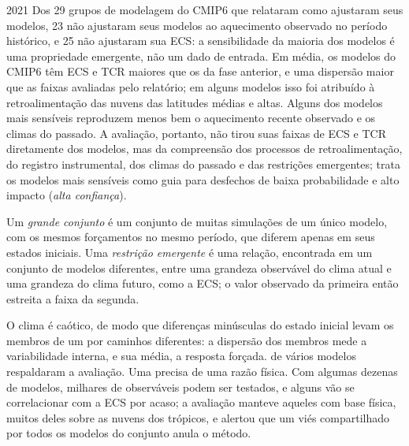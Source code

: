 \begin{dated}{2021}
Dos 29 grupos de modelagem do CMIP6 que relataram como ajustaram seus modelos, 23 não
ajustaram seus modelos ao aquecimento observado no período histórico, e
25 não ajustaram sua ECS: a sensibilidade da maioria dos modelos é uma
propriedade emergente, não um dado de entrada. Em média, os modelos do CMIP6 têm ECS e
TCR maiores que os da fase anterior, e uma dispersão maior que as faixas
avaliadas pelo relatório; em alguns modelos isso foi atribuído à retroalimentação
das nuvens das latitudes médias e altas. Alguns dos modelos mais sensíveis
reproduzem menos bem o aquecimento recente observado e os climas do passado.
A avaliação, portanto, não tirou suas faixas de ECS e TCR diretamente dos
modelos, mas da compreensão dos processos de retroalimentação, do
registro instrumental, dos climas do passado e das restrições emergentes; trata os modelos mais sensíveis como guia para
desfechos de baixa probabilidade e alto impacto (\emph{alta confiança}).
\end{dated}

\begin{definition}\label{def:b3:climate-models:evaluation}
Um \emph{grande conjunto} é um conjunto de muitas simulações
de um único modelo, com os mesmos forçamentos no mesmo período, que diferem
apenas em seus estados iniciais. Uma \emph{restrição
emergente} é uma relação, encontrada em um
conjunto de modelos diferentes, entre uma grandeza observável do
clima atual e uma grandeza do clima futuro, como a ECS; o
valor observado da primeira então estreita a faixa da segunda.
\end{definition}

O clima é caótico, de modo que diferenças minúsculas do estado inicial levam os
membros de um  por caminhos diferentes: a dispersão dos
membros mede a variabilidade interna, e sua média, a resposta forçada.
 de vários modelos respaldaram a avaliação. Uma
 precisa de uma razão física. Com algumas dezenas de modelos,
milhares de observáveis podem ser testados, e alguns vão se correlacionar com a
ECS por acaso; a avaliação manteve aqueles com base física, muitos
deles sobre as nuvens dos trópicos, e alertou que um viés compartilhado por todos
os modelos do conjunto anula o método.

